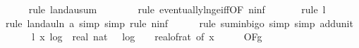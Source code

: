 \begin{isabellebody}
\ \ \ \ \isamarkupfalse%
\ {\isacharparenleft}{\kern0pt}rule\ landau{\isacharunderscore}{\kern0pt}sum{\isacharunderscore}{\kern0pt}{}{\isacharparenright}{\kern0pt}\isanewline
\ \ \ \ \ \ \isamarkupfalse%
\ {\isacharparenleft}{\kern0pt}rule\ eventually{\isacharunderscore}{\kern0pt}ln{\isacharunderscore}{\kern0pt}ge{\isacharunderscore}{\kern0pt}iff{\isacharbrackleft}{\kern0pt}OF\ n{\isacharunderscore}{\kern0pt}inf{\isacharbrackright}{\kern0pt}{\isacharparenright}{\kern0pt}\isanewline
\ \ \ \ \ \isamarkupfalse%
\ {\isacharparenleft}{\kern0pt}rule\ l{}{\isacharparenright}{\kern0pt}\isanewline
\ \ \ \ \isamarkupfalse%
\ {\isacharparenleft}{\kern0pt}rule\ landau{\isacharunderscore}{\kern0pt}ln{\isacharunderscore}{\kern0pt}{}{\isacharbrackleft}{\kern0pt}\ a{\isacharequal}{\kern0pt}{\isachardoublequoteopen}{}{\isachardoublequoteclose}{\isacharbrackright}{\kern0pt}{\isacharcomma}{\kern0pt}\ simp{\isacharcomma}{\kern0pt}\ simp{\isacharcomma}{\kern0pt}\ rule\ n{\isacharunderscore}{\kern0pt}inf{\isacharparenright}{\kern0pt}\isanewline
\ \ \ \ \isamarkupfalse%
\ {\isacharparenleft}{\kern0pt}rule\ sum{\isacharunderscore}{\kern0pt}in{\isacharunderscore}{\kern0pt}bigo{\isacharcomma}{\kern0pt}\ simp{\isacharcomma}{\kern0pt}\ simp\ add{\isacharcolon}{\kern0pt}unit{\isacharunderscore}{\kern0pt}{}{\isacharparenright}{\kern0pt}\isanewline
\ \ \isanewline
\ \ \isamarkupfalse%
\ l{}{\isacharcolon}{\kern0pt}\ {\isachardoublequoteopen}{\isacharparenleft}{\kern0pt}{\isasymlambda}x{\isachardot}{\kern0pt}\ log\ {}\ {\isacharparenleft}{\kern0pt}real\ {\isacharparenleft}{\kern0pt}nat\ {\isacharparenleft}{\kern0pt}{}\ {\isacharasterisk}{\kern0pt}\ {\isasymlceil}log\ {}\ {\isacharparenleft}{\kern0pt}{}\ {\isacharslash}{\kern0pt}\ real{\isacharunderscore}{\kern0pt}of{\isacharunderscore}{\kern0pt}rat\ {\isacharparenleft}{\kern0pt}{\isasymdelta}{\isacharunderscore}{\kern0pt}of\ x{\isacharparenright}{\kern0pt}{\isacharparenright}{\kern0pt}{\isasymrceil}\ {\isacharplus}{\kern0pt}\ {}{}{\isacharparenright}{\kern0pt}{\isacharparenright}{\kern0pt}\ {\isacharplus}{\kern0pt}\ {}{\isacharparenright}{\kern0pt}{\isacharparenright}{\kern0pt}\ {\isasymin}\ O{\isacharbrackleft}{\kern0pt}{\isacharquery}{\kern0pt}F{\isacharbrackright}{\kern0pt}{\isacharparenleft}{\kern0pt}g{\isacharparenright}{\kern0pt}{\isachardoublequoteclose}\isanewline

\end{isabellebody}
